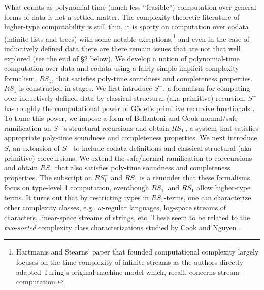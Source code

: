 \documentclass[envcountsame]{llncs}
\newcommand{\RSi}{\mathit{RS_1}}
\newcommand{\RSmi}{\mathit{RS^-_1}}
\begin{document}
What counts as polynomial-time (much less ``feasible'') computation
over general forms of data is not a settled matter.  The
complexity-theoretic literature of higher-type computability is
still thin, it is  spotty on computation over codata (infinite
lists and trees) with some notable exceptions,\footnote{Hartmanis and Stearns' paper \cite{HartmanisStearns65} that
  founded computational complexity largely focuses on the
  time-complexity of infinite streams as the authors directly
  adapted Turing's original machine model \cite{Turing36}
  which, recall, concerns stream-computation.}  
and even in the case of inductively defined data there are there
remain issues that are not that well explored (see the end of \S2
below).  We develop a notion of polynomial-time computation over
data and codata using a fairly simple implicit complexity formalism,
$\RSi$, that satisfies poly-time soundness and completeness
properties.  $\RSi$ is constructed in stages.  We first introduce 
$S^-$, a formalism for computing over inductively defined data by
classical structural (aka primitive) recursion.  $S^-$ has roughly 
the computational power of G\"{o}del's primitive recursive
functionals \cite{Longley:notions:1}.  To tame this power, we impose
a form of Bellantoni and Cook normal/safe ramification on $S^-$'s
structural recursions and obtain $\RSmi$, a system that satisfies
appropriate poly-time soundness and completeness properties.  We
next introduce $S$, an extension of $S^-$
to include codata definitions and
classical structural (aka primitive) corecursions.  We extend the
safe/normal ramification to corecursions and obtain $\RSi$ that
also satisfies  poly-time soundness and completeness
properties.  The subscript on $\RSmi$ and $\RSi$ is a reminder
that these formalisms focus on type-level 1 computation, eventhough
$\RSmi$ and $\RSi$ allow higher-type terms.  It turns out that by
restricting types in $\RSi$-terms, one can characterize other
complexity classes, e.g., $\omega$-regular languages, log-space
streams of characters, linear-space streams of strings, etc.  These
seem to be related to the \emph{two-sorted} complexity class
characterizations studied by Cook and Nguyen \cite{CookNguyen:book}.
\end{document}

